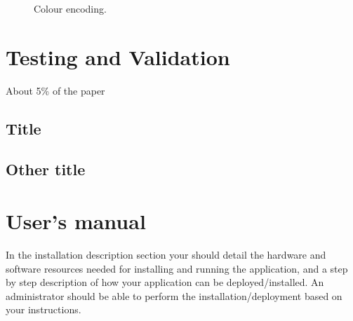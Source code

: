 \documentclass[12pt,a4paper,twoside]{report}
\begin{document}
\begin{figure}
	\label{colors}
	\centering
	\caption{Colour encoding.}
\end{figure}


\chapter{Testing and Validation}

About 5\% of the paper
\section{Title}
\section{Other title}

\chapter{User's manual}

In the installation description section your should detail the hardware and software resources needed for installing and running the application, and a step by step description of how your application can be deployed/installed. An administrator should be able to perform the installation/deployment based on your instructions.
\end{document}
